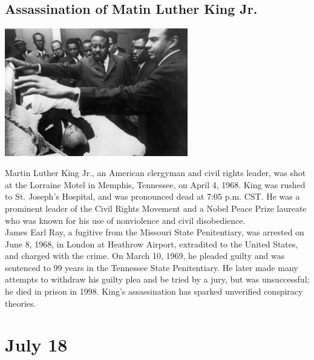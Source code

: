 \documentclass[11pt]{report}
\begin{document}
\subsection{Assassination of Matin Luther King Jr.}
\vspace{2mm}\begin{center}\includegraphics[width=8cm]{./img/LutherKingAssassination.jpg}\end{center}
Martin Luther King Jr., an American clergyman and civil rights leader, was shot at the Lorraine Motel in Memphis, Tennessee, on April 4, 1968. King was rushed to St. Joseph's Hospital, and was pronounced dead at 7:05 p.m. CST. He was a prominent leader of the Civil Rights Movement and a Nobel Peace Prize laureate who was known for his use of nonviolence and civil disobedience.\\
\indent James Earl Ray, a fugitive from the Missouri State Penitentiary, was arrested on June 8, 1968, in London at Heathrow Airport, extradited to the United States, and charged with the crime. On March 10, 1969, he pleaded guilty and was sentenced to 99 years in the Tennessee State Penitentiary. He later made many attempts to withdraw his guilty plea and be tried by a jury, but was unsuccessful; he died in prison in 1998. King's assassination has sparked unverified conspiracy theories.
\section{July 18}
\end{document}
